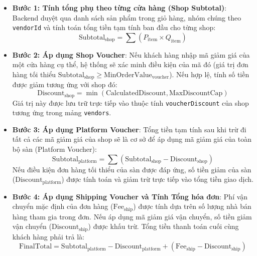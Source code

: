 \documentclass[../DoAn.tex]{subfiles}
\begin{document}
\begin{itemize}
    \item \textbf{Bước 1: Tính tổng phụ theo từng cửa hàng (Shop Subtotal)}:
        Backend duyệt qua danh sách sản phẩm trong giỏ hàng, nhóm chúng theo \texttt{vendorId} và tính toán tổng tiền tạm tính ban đầu cho từng shop:
        \begin{equation}
            \text{Subtotal}_{\text{shop}} = \sum (P_{\text{item}} \times Q_{\text{item}})
        \end{equation}
    \item \textbf{Bước 2: Áp dụng Shop Voucher}:
        Nếu khách hàng nhập mã giảm giá của một cửa hàng cụ thể, hệ thống sẽ xác minh điều kiện của mã đó (giá trị đơn hàng tối thiểu $\text{Subtotal}_{\text{shop}} \ge \text{MinOrderValue}_{\text{voucher}}$). Nếu hợp lệ, tính số tiền được giảm tương ứng với shop đó:
        \begin{equation}
            \text{Discount}_{\text{shop}} = \min(\text{CalculatedDiscount}, \text{MaxDiscountCap})
        \end{equation}
        Giá trị này được lưu trữ trực tiếp vào thuộc tính \texttt{voucherDiscount} của shop tương ứng trong mảng \texttt{vendors}.
    \item \textbf{Bước 3: Áp dụng Platform Voucher}:
        Tổng tiền tạm tính sau khi trừ đi tất cả các mã giảm giá của shop sẽ là cơ sở để áp dụng mã giảm giá của toàn bộ sàn (Platform Voucher):
        \begin{equation}
            \text{Subtotal}_{\text{platform}} = \sum (\text{Subtotal}_{\text{shop}} - \text{Discount}_{\text{shop}})
        \end{equation}
        Nếu điều kiện đơn hàng tối thiểu của sàn được đáp ứng, số tiền giảm của sàn ($\text{Discount}_{\text{platform}}$) được tính toán và giảm trừ trực tiếp vào tổng tiền giao dịch.
    \item \textbf{Bước 4: Áp dụng Shipping Voucher và Tính Tổng hóa đơn}:
        Phí vận chuyển mặc định của đơn hàng ($\text{Fee}_{\text{ship}}$) được tính dựa trên số lượng nhà bán hàng tham gia trong đơn. Nếu áp dụng mã giảm giá vận chuyển, số tiền giảm vận chuyển ($\text{Discount}_{\text{ship}}$) được khấu trừ. Tổng tiền thanh toán cuối cùng khách hàng phải trả là:
        \begin{equation}
            \text{FinalTotal} = \text{Subtotal}_{\text{platform}} - \text{Discount}_{\text{platform}} + (\text{Fee}_{\text{ship}} - \text{Discount}_{\text{ship}})
        \end{equation}
\end{itemize}
\end{document}
